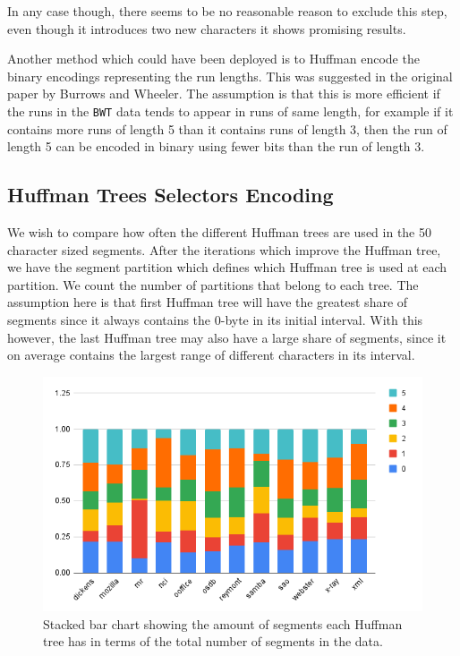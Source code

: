 \documentclass{article}
\begin{document}
In any case though, there seems to be no reasonable reason to exclude this step, even though it introduces two new characters it shows promising results.

Another method which could have been deployed is to Huffman encode the binary encodings representing the run lengths. This was suggested in the original paper by Burrows and Wheeler. The assumption is that this is more efficient if the runs in the \texttt{BWT} data tends to appear in runs of same length, for example if it contains more runs of length 5 than it contains runs of length 3, then the run of length 5 can be encoded in binary using fewer bits than the run of length 3.

\subsection{Huffman Trees Selectors Encoding}
We wish to compare how often the different Huffman trees are used in the 50 character sized segments. After the iterations which improve the Huffman tree, we have the segment partition which defines which Huffman tree is used at each partition. We count the number of partitions that belong to each tree. The assumption here is that first Huffman tree will have the greatest share of segments since it always contains the 0-byte in its initial interval. With this however, the last Huffman tree may also have a large share of segments, since it on average contains the largest range of different characters in its interval.
\begin{figure}[H]
    \centering
    \includegraphics[width=\textwidth]{images/Selectors.png}
    \caption{Stacked bar chart showing the amount of segments each Huffman tree has in terms of the total number of segments in the data.}
\end{figure}
\end{document}
